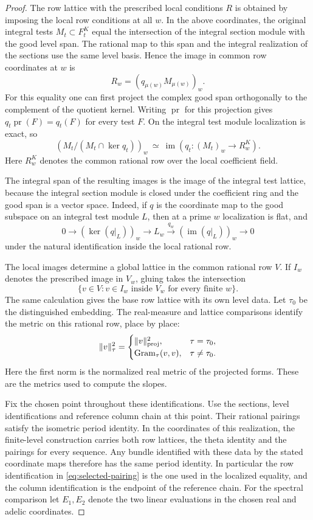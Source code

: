 \begin{proof}
The row lattice with the prescribed local conditions \(R\) is obtained by imposing the
local row conditions at all \(w\). In the above coordinates,
the original integral tests \(M_t\subset F_t^K\) equal the intersection of the integral section module with the good
level span. The rational map to this span and the integral realization of the sections use the same level basis. Hence the image
in common row coordinates at \(w\) is
\[
                   R_w=(q_{\mu(w)} M_{\mu(w)})_w .
\]
For this equality one can first project the complex good
span orthogonally to the complement of the quotient kernel.
Writing \(\operatorname{pr}\) for this projection gives
\(q_t\operatorname{pr}(F)=q_t(F)\) for every test \(F\).
On the integral test module localization is exact, so
\[
   (M_t/(M_t\cap\ker q_t))_w
       \ \simeq\ \operatorname{im}(q_t:(M_t)_w\to R^K_w).
\]
Here \(R^K_w\) denotes the common rational row over the
local coefficient field.

The integral span of the resulting
images is the image of the integral test lattice, because
the integral section module is closed under the coefficient
ring and the good span is a vector space. Indeed, if \(q\) is the coordinate map to the good subspace on an integral
test module \(L\), then at a prime \(w\) localization is flat, and
\[
 0\longrightarrow (\ker(q|_L))_w\longrightarrow L_w
       \xrightarrow{q_w}(\operatorname{im}(q|_L))_w\longrightarrow0
\]
under the natural identification inside the local rational row.

The local images determine a global lattice in the common rational row \(V\). If \(I_w\) denotes the prescribed image in \(V_w\), gluing takes the intersection
\[
 \{v\in V:v\in I_w\text{ inside }V_w\text{ for every finite }w\}.
\] The same calculation gives the base row lattice
with its own level data. Let \(\tau_0\) be the distinguished embedding. The real-measure and lattice comparisons identify the metric on this rational row, place by place: 
\[
 \|v\|_\tau^2=\begin{cases}\|v\|_{\rm proj}^2,&\tau=\tau_0,\\ \operatorname{Gram}_\tau(v,v),&\tau\ne\tau_0.\end{cases}
\]
 Here the first norm is the normalized real metric of the projected forms. These are the metrics used to compute the slopes.
\label{cor:selected-period-5}

Fix the chosen point throughout these identifications.
Use the sections, level identifications and reference column chain at this point. Their rational pairings satisfy the isometric period identity. In the coordinates of this realization, the finite-level construction carries both row lattices, the theta identity and the pairings for every sequence. Any bundle identified with these data by the stated coordinate maps therefore has the same period identity. In particular
the row identification in \eqref{eq:selected-pairing}
is the one used in the localized equality, and the column
identification is the endpoint of the reference chain.
For the spectral comparison let \(E_1,E_2\) denote the two
linear evaluations in the chosen real and adelic coordinates.


\end{proof}
